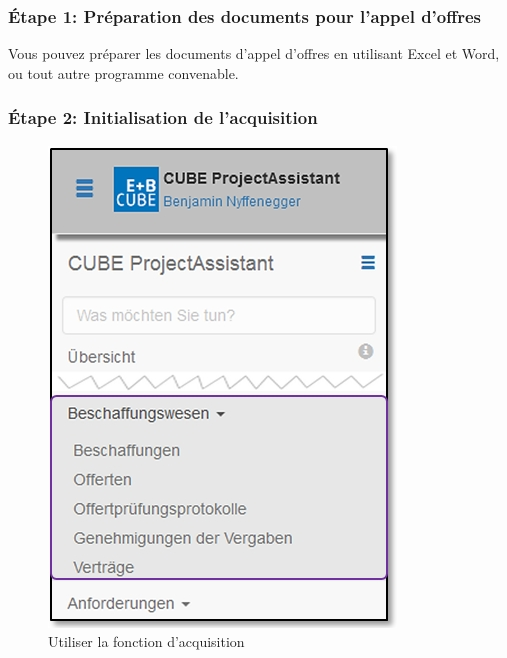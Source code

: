 \subsubsection{Étape 1: Préparation des documents pour l'appel d'offres}

Vous pouvez préparer les documents d'appel d'offres en utilisant Excel et Word, ou tout autre programme convenable.

\subsubsection{Étape 2: Initialisation de l'acquisition}

\begin{figure}   %
  \vspace{-35pt}      %
  \begin{center}
    \includegraphics[width=1\linewidth]{../chapters/07_Beschaffungswesen/pictures/7-1-2_Menu_Beschaffungswesen.jpg}
  \end{center}
  \vspace{-20pt}
  \caption{Utiliser la fonction d'acquisition}
  \vspace{-10pt}
\end{figure}

